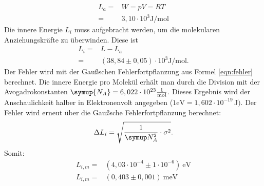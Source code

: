 \begin{align*}
  L_a =& W =pV=RT \\
      =& 3,10 \cdot 10^3 \si{\joule \per \mol}
\end{align*}
Die innere Energie $L_i$ muss aufgebracht werden, um die molekularen
Anziehungskräfte zu überwinden. Diese ist
\begin{align*}
  L_i=&L-L_a \\
  =& (38,84 \pm 0,05)\cdot 10^3 \si{\joule\per\mol}.
\end{align*}
Der Fehler wird mit der Gaußschen Fehlerfortpflanzung aus Formel \eqref{eqn:fehler}
berechnet.
Die innere Energie pro Molekül erhält man durch die Division mit der Avogadrokonstanten
$\symup{N_A}=6,022 \cdot 10^{23} \frac{1}{\si{\mol}}$.
Dieses Ergebnis wird der Anschaulichkeit halber in Elektronenvolt angegeben
($1\si{\electronvolt}=1,602\cdot 10^{-19}\,\si{\joule})$.
Der Fehler wird erneut über die Gaußsche Fehlerfortpflanzung berechnet:
\begin{equation*}
   \Delta L_i=\sqrt{\frac{1}{\symup N_A^2}\cdot \sigma^2}.
\end{equation*}
Somit:
\begin{align*}
   L_{i,m} =&(4,03\cdot 10^{-4} \pm 1\cdot 10^{-6})\ \si{\electronvolt} \\
   L_{i,m} =&(0,403 \pm 0,001) \ \si{\milli\electronvolt}
\end{align*}
